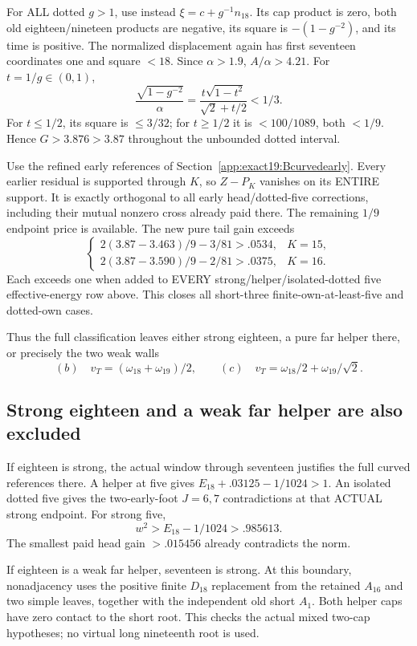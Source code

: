 \documentclass[11pt]{article}
\theoremstyle{definition}
\theoremstyle{remark}
\begin{document}
For ALL dotted \(g>1\), use instead
\(\xi=c+g^{-1}n_{18}\).
Its cap product is zero, both
old eighteen/nineteen products
are negative, its square is
\(-(1-g^{-2})\), and its time
is positive.
The normalized displacement again
has first seventeen coordinates
one and square \(<18\).
Since \(\alpha>1.9\),
\(A/\alpha>4.21\).
For \(t=1/g\in(0,1)\),
\[
 \frac{\sqrt{1-g^{-2}}}{\alpha}
       =\frac{t\sqrt{1-t^2}}{\sqrt2+t/2}<1/3 .
\]
For \(t\le1/2\), its square is
\(\le3/32\); for \(t\ge1/2\)
it is \(<100/1089\), both \(<1/9\).
Hence \(G>3.876>3.87\) throughout
the unbounded dotted interval.

Use the refined early references
of Section~\ref{app:exact19:Bcurvedearly}.
Every earlier residual is supported
through \(K\), so \(Z-P_K\)
vanishes on its ENTIRE support.
It is exactly orthogonal to all
early head/dotted-five corrections,
including their mutual nonzero
cross already paid there.
The remaining \(1/9\) endpoint
price is available.
The new pure tail gain exceeds
\[
 \begin{cases}
 2(3.87-3.463)/9-3/81>.0534,&K=15,\\
 2(3.87-3.590)/9-2/81>.0375,&K=16 .
 \end{cases}
\]
Each exceeds one when added to
EVERY strong/helper/isolated-dotted
five effective-energy row above.
This closes all short-three
finite-own-at-least-five and
dotted-own cases.

Thus the full classification
leaves either strong eighteen,
a pure far helper there, or
precisely the two weak walls
\[
       (b)\quad v_T=(\omega_{18}+\omega_{19})/2,\qquad
       (c)\quad v_T=\omega_{18}/2+\omega_{19}/\sqrt2 .
\tag{B19survivors}\label{app:exact19:eq:Bsurvivors}
\]

\subsection{Strong eighteen and a weak far helper are also excluded}
\label{app:exact19:Bendstates}

If eighteen is strong, the actual
window through seventeen justifies
the full curved references there.
A helper at five gives
\(E_{18}+.03125-1/1024>1\).
An isolated dotted five gives
the two-early-foot \(J=6,7\)
contradictions at that ACTUAL
strong endpoint.
For strong five,
\[
                      w^2>E_{18}-1/1024>.985613 .
\]
The smallest paid head gain
\(>.015456\) already contradicts
the norm.

If eighteen is a weak far helper,
seventeen is strong.
At this boundary, nonadjacency
uses the positive finite
\(D_{18}\) replacement from
the retained \(A_{16}\) and two
simple leaves, together with the
independent old short \(A_1\).
Both helper caps have zero
contact to the short root.
This checks the actual mixed
two-cap hypotheses; no virtual
long nineteenth root is used.
\end{document}
